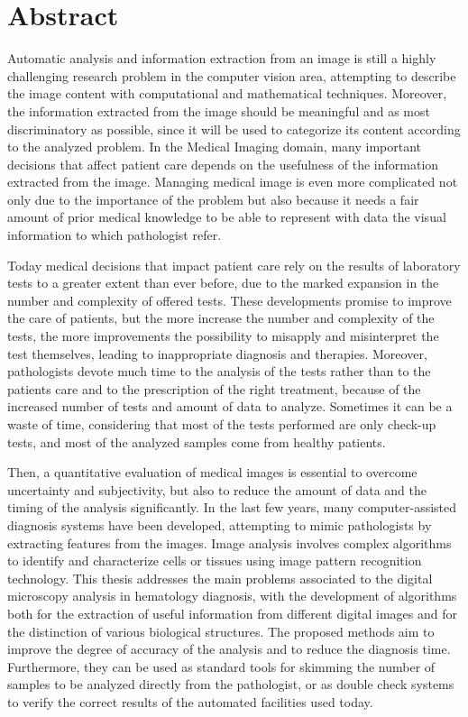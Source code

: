 \chapter*{Abstract}	
\label{chap:global_abstract}

Automatic analysis and information extraction from an image is still a highly challenging research problem in the computer vision area, attempting to describe the image content with computational and mathematical techniques. Moreover, the information extracted from the image should be meaningful and as most discriminatory as possible, since it will be used to categorize its content according to the analyzed problem. In the Medical Imaging domain, many important decisions that affect patient care depends on the usefulness of the information extracted from the image. Managing medical image is even more complicated not only due to the importance of the problem but also because it needs a fair amount of prior medical knowledge to be able to represent with data the visual information to which pathologist refer. 

Today medical decisions that impact patient care rely on the results of laboratory tests to a greater extent than ever before, due to the marked expansion in the number and complexity of offered tests. These developments promise to improve the care of patients, but the more increase the number and complexity of the tests, the more improvements the possibility to misapply and misinterpret the test themselves, leading to inappropriate diagnosis and therapies.  Moreover, pathologists devote much time to the analysis of the tests rather than to the patients care and to the prescription of the right treatment, because of the increased number of tests and amount of data to analyze. Sometimes it can be a waste of time, considering that most of the tests performed are only check-up tests, and most of the analyzed samples come from healthy patients.

Then, a quantitative evaluation of medical images is essential to overcome uncertainty and subjectivity, but also to reduce the amount of data and the timing of the analysis significantly. In the last few years, many computer-assisted diagnosis systems have been developed, attempting to mimic pathologists by extracting features from the images. Image analysis involves complex algorithms to identify and characterize cells or tissues using image pattern recognition technology. This thesis addresses the main problems associated to the digital microscopy analysis in hematology diagnosis, with the development of algorithms both for the extraction of useful information from different digital images and for the distinction of various biological structures. The proposed methods aim to improve the degree of accuracy of the analysis and to reduce the diagnosis time. Furthermore, they can be used as standard tools for skimming the number of samples to be analyzed directly from the pathologist, or as double check systems to verify the correct results of the automated facilities used today.